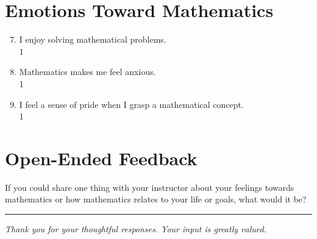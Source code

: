 \documentclass[12pt]{article}
\begin{document}
\vspace{1em}

\section*{Emotions Toward Mathematics}

\begin{enumerate}[label=\arabic*., leftmargin=1.5em]
    \setcounter{enumi}{6}
    \item I enjoy solving mathematical problems. \\
          \hfill 1    
    \item Mathematics makes me feel anxious. \\
          \hfill 1    
    \item I feel a sense of pride when I grasp a mathematical concept. \\
          \hfill 1    
\end{enumerate}

\vspace{1.5em}

\section*{Open-Ended Feedback}

\begin{flushleft}
    \textnormal{If you could share one thing with your instructor about your feelings towards mathematics or how mathematics relates to your life or goals, what would it be?}
\end{flushleft}

\vspace{2em}
\noindent\textcolor{linegray}{\rule{\textwidth}{0.4pt}}

\vspace{2em}
\begin{center}
    \textnormal{\textit{Thank you for your thoughtful responses. Your input is greatly valued.}}
\end{center}
\end{document}
